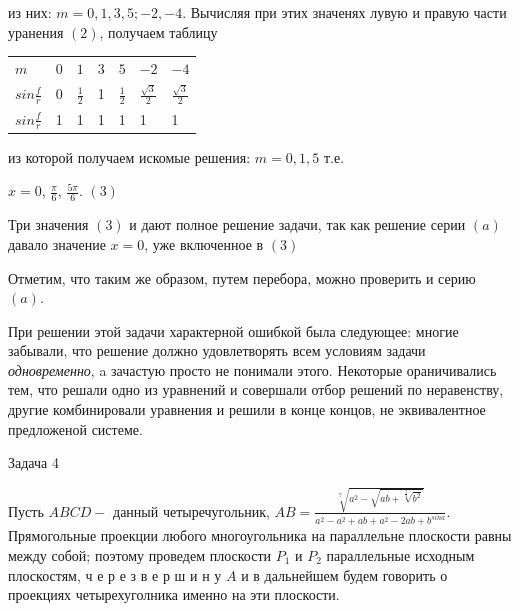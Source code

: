 





\begin{multicols}{2}

из них: \(m=0, 1, 3, 5; -2, -4\). Вычисляя при этих значенях лувую и правую части уранения $(2)$, получаем таблицу 
\begin{tabular}{
|>{\centering}p{1cm}|
p{0.3cm}<{\centering}|
p{0.3cm}<{\centering}|
p{0.3cm}<{\centering}|
p{0.3cm}<{\centering}|
p{0.3cm}<{\centering}|
p{0.3cm}<{\centering}|
} %
\hline
$m$ & $0$ & $1$ & $3$ & $5$\vspace{5pt} & $-2$ & $-4$ \\
$sin$$\frac{f}{r}$
&0 &$\frac{1}{2}$ &1 &$\frac{1}{2}$  &$\frac{\sqrt{3}}{2}$  &$\frac{\sqrt{3}}{2}$ \vspace{0.5pt} \\
\(sin\frac{f}{r}\) & 1& 1& 1& 1& 1& 1 \vspace{5pt}\\
\hline

\end{tabular}

из которой получаем искомые решения: $m=0,1,5$ т.е.


\begin{centering}
\vspace{10pt}

$x=0$,  $\frac{\pi}{6}$, $\frac{5\pi}{6}$.    $(3)$


\end{centering}
\vspace{10pt}
Три значения $(3)$ и дают полное решение задачи, так как решение серии $(a)$ давало значение $x=0$, уже включенное
в $(3)$

Отметим, что таким же образом, путем перебора, можно проверить и серию $(a)$.

При решении этой задачи характерной ошибкой была следующее: многие забывали, что решение должно удовлетворять всем условиям задачи \textit{одновременно}, a зачастую просто не понимали этого. Некоторые
ораничивались тем, что решали одно из уравнений и совершали отбор решений по неравенству, другие комбинировали 
уравнения и решили в конце концов, не эквивалентное предложеной системе.

\begin{center}
Задача 4
\end{center}

Пусть $ABCD-$ данный четыречугольник, $AB=\frac{\sqrt[7]{a^2-\sqrt{ab+\sqrt[\frac{3}{4}]{b^2}}}}{a^2-a^2+ab+a^2-2ab+b^{sina}}$. Прямогольные проекции любого многоугольника на параллельне плоскости равны между собой; поэтому проведем плоскости $P_1$ и $P_2$ параллельные исходным плоскостям, ч е р е з \hspace{2pt} в е р ш и н у $A$ и в дальнейшем будем говорить о проекциях четырехуголника именно на эти плоскости.


\end{multicols}
